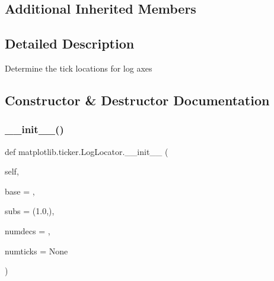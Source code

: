 \subsection*{Additional Inherited Members}


\subsection{Detailed Description}
\begin{DoxyVerb}Determine the tick locations for log axes
\end{DoxyVerb}
 

\subsection{Constructor \& Destructor Documentation}
\mbox{\label{classmatplotlib_1_1ticker_1_1LogLocator_a175402f3869188b24ba81a24757716e5}} 
\subsubsection{\texorpdfstring{\+\_\+\+\_\+init\+\_\+\+\_\+()}{\_\_init\_\_()}}
{\footnotesize\ttfamily def matplotlib.\+ticker.\+Log\+Locator.\+\_\+\+\_\+init\+\_\+\+\_\+ (\begin{DoxyParamCaption}\item[{}]{self,  }\item[{}]{base = {},  }\item[{}]{subs = {\ttfamily (1.0,)},  }\item[{}]{numdecs = {},  }\item[{}]{numticks = {\ttfamily None} }\end{DoxyParamCaption})}

